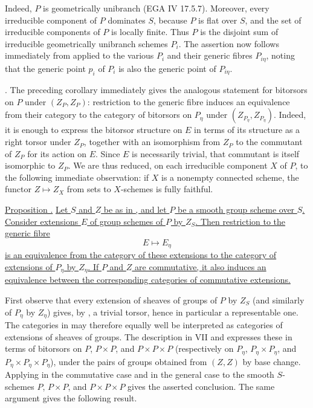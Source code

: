 Indeed, $P$ is geometrically unibranch (EGA IV 17.5.7).  Moreover,
every irreducible component of $P$ dominates $S$, because $P$ is flat
over $S$, and the set of irreducible components of $P$ is locally
finite.  Thus $P$ is the disjoint sum of irreducible geometrically
unibranch schemes $P_i$.  The assertion now follows immediately from
 applied to the various $P_i$ and their generic fibres $P_{i\eta}$,
noting that the generic point $p_i$ of $P_i$ is also the generic point
of $P_{i\eta}$.

\medskip
\noindent {}.  The preceding corollary immediately gives the
analogous statement for bitorsors on $P$ under $(Z_P,Z_P)$: restriction
to the generic fibre induces an equivalence from their category to the
category of bitorsors on $P_\eta$ under
$(Z_{P_\eta},Z_{P_\eta})$.  Indeed, it is enough to express the bitorsor
structure on $E$ in terms of its structure as a right torsor under
$Z_P$, together with an isomorphism from $Z_P$ to the commutant of
$Z_P$ for its action on $E$.  Since $E$ is necessarily trivial, that
commutant is itself isomorphic to $Z_P$.  We are thus reduced, on each
irreducible component $X$ of $P$, to the following immediate
observation: if $X$ is a nonempty connected scheme, the functor
$Z\mapsto Z_X$ from sets to $X$-schemes is fully faithful.

\medskip
\noindent\underline{Proposition .}  \underline{Let $S$ and $Z$ be
as in , and let $P$ be a smooth group scheme over $S$.  Consider
extensions $E$ of group schemes of $P$ by $Z_S$.  Then restriction to
the generic fibre}
\[
 E\longmapsto E_\eta
\]
\underline{is an equivalence from the category of these extensions to
the category of extensions of $P_\eta$ by $Z_\eta$.  If $P$ and $Z$
are commutative, it also induces an equivalence between the
corresponding categories of commutative extensions.}

First observe that every extension of sheaves of groups of $P$ by
$Z_S$ (and similarly of $P_\eta$ by $Z_\eta$) gives, by , a trivial
torsor, hence in particular a representable one.  The categories in
 may therefore equally well be interpreted as categories of
extensions of sheaves of groups.  The description in VII  and
 expresses these in terms of bitorsors on
$P$, $P\times P$, and $P\times P\times P$ (respectively on
$P_\eta$, $P_\eta\times P_\eta$, and
$P_\eta\times P_\eta\times P_\eta$), under the pairs of groups
obtained from $(Z,Z)$ by base change.  Applying  in the commutative
case and  in the general case to the smooth $S$-schemes
$P$, $P\times P$, and $P\times P\times P$ gives the asserted
conclusion.  The same argument gives the following result.

